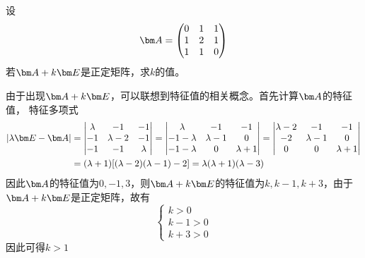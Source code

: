 \begin{example}
    设
    \[
        \mat{A} =
        \begin{pmatrix}
            0 & 1 & 1 \\
            1 & 2 & 1 \\
            1 & 1 & 0
        \end{pmatrix}
    \]若$\mat{A}+k\mat{E}$是正定矩阵，求$k$的值。
\end{example}
\begin{solution}
    由于出现$\mat{A}+k\mat{E}$，可以联想到特征值的相关概念。首先计算$\mat{A}$的特征值，
    特征多项式
    \begin{align*}
        |\lambda \mat{E} - \mat{A}| & =
        \begin{vmatrix}
            \lambda & -1        & -1      \\
            -1      & \lambda-2 & -1      \\
            -1      & -1        & \lambda
        \end{vmatrix}
        =
        \begin{vmatrix}
            \lambda    & -1        & -1        \\
            -1-\lambda & \lambda-1 & 0         \\
            -1-\lambda & 0         & \lambda+1
        \end{vmatrix}
        =
        \begin{vmatrix}
            \lambda-2 & -1        & -1        \\
            -2        & \lambda-1 & 0         \\
            0         & 0         & \lambda+1
        \end{vmatrix}      \\
                                    & =
        (\lambda+1)[(\lambda-2)(\lambda-1)-2]
        =\lambda(\lambda+1)(\lambda - 3)
    \end{align*}
    因此$\mat{A}$的特征值为$0,-1,3$，则$\mat{A}+k\mat{E}$的特征值为$k,k-1,k+3$，由于$\mat{A}+k\mat{E}$是正定矩阵，故有
    \[
        \begin{cases}
            k>0   \\
            k-1>0 \\
            k+3>0
        \end{cases}
    \]
    因此可得$k>1$
\end{solution}